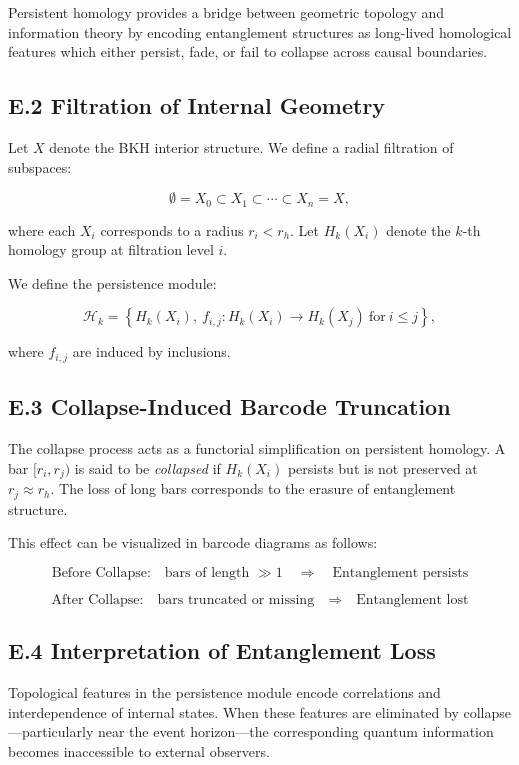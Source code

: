 \documentclass[11pt]{article}
\begin{document}
Persistent homology provides a bridge between geometric topology and information theory by encoding entanglement structures as long-lived homological features which either persist, fade, or fail to collapse across causal boundaries.

\subsection*{E.2 Filtration of Internal Geometry}

Let \( X \) denote the BKH interior structure. We define a radial filtration of subspaces:

\[
\emptyset = X_0 \subset X_1 \subset \cdots \subset X_n = X,
\]

where each \( X_i \) corresponds to a radius \( r_i < r_h \). Let \( H_k(X_i) \) denote the \( k \)-th homology group at filtration level \( i \).

We define the persistence module:

\[
\mathcal{H}_k = \left\{ H_k(X_i),\ f_{i,j} : H_k(X_i) \to H_k(X_j)\ \text{for}\ i \leq j \right\},
\]

where \( f_{i,j} \) are induced by inclusions.

\subsection*{E.3 Collapse-Induced Barcode Truncation}

The collapse process acts as a functorial simplification on persistent homology. A bar \( [r_i, r_j) \) is said to be \textit{collapsed} if \( H_k(X_i) \) persists but is not preserved at \( r_j \approx r_h \). The loss of long bars corresponds to the erasure of entanglement structure.

This effect can be visualized in barcode diagrams as follows:

\[
\text{Before Collapse:}
\quad \text{bars of length } \gg 1 \quad \Rightarrow \quad \text{Entanglement persists}
\]

\[
\text{After Collapse:}
\quad \text{bars truncated or missing} \quad \Rightarrow \quad \text{Entanglement lost}
\]

\subsection*{E.4 Interpretation of Entanglement Loss}

Topological features in the persistence module encode correlations and interdependence of internal states. When these features are eliminated by collapse—particularly near the event horizon—the corresponding quantum information becomes inaccessible to external observers.
\end{document}
